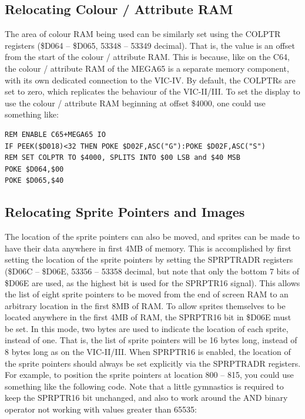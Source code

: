 \subsection{Relocating Colour / Attribute RAM}

The area of colour RAM being used can be similarly set using the COLPTR registers (\$D064 -- \$D065, 53348 -- 53349 decimal). That is, the value is an offset from the start of the colour / attribute RAM.  This is because, like on the C64, the colour / attribute RAM of the MEGA65 is a separate memory component, with its own dedicated connection to the VIC-IV.  By default, the COLPTRs are set to zero, which replicates the behaviour of the VIC-II/III.  To set the display to use the colour / attribute RAM beginning at offset \$4000, one could use something like:

\begin{tcolorbox}[colback=black,coltext=white]
\verbatimfont{\codefont}
\begin{verbatim}
REM ENABLE C65+MEGA65 IO
IF PEEK($D018)<32 THEN POKE $D02F,ASC("G"):POKE $D02F,ASC("S")
REM SET COLPTR TO $4000, SPLITS INTO $00 LSB and $40 MSB
POKE $D064,$00
POKE $D065,$40
\end{verbatim}
\end{tcolorbox}

\subsection{Relocating Sprite Pointers and Images}

The location of the sprite pointers can also be moved, and sprites can be made to have their data anywhere in first 4MB of memory.
This is accomplished by first setting the location of the sprite pointers by setting the SPRPTRADR registers (\$D06C -- \$D06E, 53356 -- 53358 decimal, but note that only the bottom 7 bits of \$D06E are used, as the highest bit is used for the SPRPTR16 signal).  This allows the list of
eight sprite pointers to be moved from the end of screen RAM to an arbitrary location in the first 8MB of RAM.  To allow sprites themselves
to be located anywhere in the first 4MB of RAM, the SPRPTR16 bit in \$D06E must be set. In this mode, two bytes are used to indicate the
location of each sprite, instead of one. That is, the list of sprite pointers will be 16 bytes long, instead of 8 bytes long as on the VIC-II/III.  When SPRPTR16 is enabled, the location of the sprite pointers should always be set explicitly via the SPRPTRADR registers.
For example, to position the sprite pointers at location 800 -- 815, you could use something like the following code. Note that a little gymnastics is required to keep the SPRPTR16 bit unchanged, and also to work around the AND binary operator not working with values greater than 65535:

